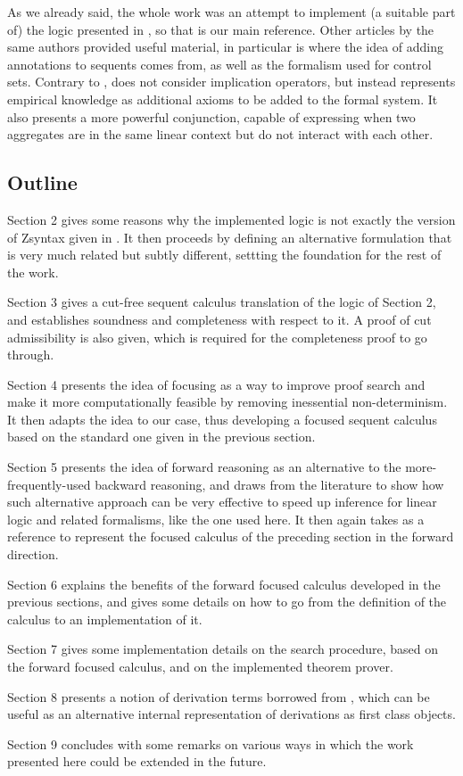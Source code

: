 As we already said, the whole work was an attempt to implement (a suitable part
of) the logic presented in \cite{adding-logic}, so that is our main reference.
Other articles by the same authors provided useful material, in particular
\cite{non-mono} is where the idea of adding annotations to sequents comes from,
as well as the formalism used for control sets.  Contrary to
\cite{adding-logic}, \cite{non-mono} does not consider implication operators,
but instead represents empirical knowledge as additional axioms to be added to
the formal system. It also presents a more powerful conjunction, capable of
expressing when two aggregates are in the same linear context but do not
interact with each other.

\subsection{Outline}

Section 2 gives some reasons why the implemented logic is not exactly the
version of Zsyntax given in \cite{adding-logic}. It then proceeds by defining an
alternative formulation that is very much related but subtly different, settting
the foundation for the rest of the work.

Section 3 gives a cut-free sequent calculus translation of the logic of Section
2, and establishes soundness and completeness with respect to it. A proof of cut
admissibility is also given, which is required for the completeness proof to go
through.

Section 4 presents the idea of focusing as a way to improve proof search and
make it more computationally feasible by removing inessential
non-determinism. It then adapts the idea to our case, thus developing a focused
sequent calculus based on the standard one given in the previous section.

Section 5 presents the idea of forward reasoning as an alternative to the
more-frequently-used backward reasoning, and draws from the literature to show
how such alternative approach can be very effective to speed up inference for
linear logic and related formalisms, like the one used here.  It then again
takes \cite{chaudhuri-thesis} as a reference to represent the focused calculus
of the preceding section in the forward direction.

Section 6 explains the benefits of the forward focused calculus developed in the
previous sections, and gives some details on how to go from the definition of
the calculus to an implementation of it.

Section 7 gives some implementation details on the search procedure, based on
the forward focused calculus, and on the implemented theorem prover.

Section 8 presents a notion of derivation terms borrowed from
\cite{chaudhuri-thesis}, which can be useful as an alternative internal
representation of derivations as first class objects.

Section 9 concludes with some remarks on various ways in which the work
presented here could be extended in the future.

